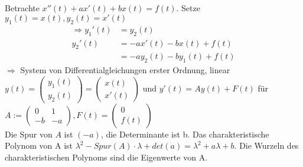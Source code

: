 \documentclass[12pt,a4paper]{article}
\newcommand{\DGLs}{Differentialgleichungen }
\begin{document}
\subsection{}
Betrachte $x''(t) + ax'(t) +bx(t) = f(t)$. Setze $y_1(t) = x(t), y_2(t) = x'(t)$
\begin{align*}
\Rightarrow y_1'(t) &= y_2(t) \\
y_2'(t) &= -ax'(t)-bx(t)+f(t) \\
&= -ay_2(t)-by_1(t)+f(t)
\end{align*}
$\Rightarrow$ System von \DGLs erster Ordnung, linear \\
$y(t) = \begin{pmatrix}
y_1(t) \\
y_2(t)
\end{pmatrix} = \begin{pmatrix}
x(t) \\
x'(t)
\end{pmatrix} $ und $y'(t) = Ay(t) + F(t)$ für $A:= \begin{pmatrix}
0 & 1 \\
-b & -a
\end{pmatrix}, F(t) = \begin{pmatrix}
0 \\
f(t)
\end{pmatrix}$ \\
Die Spur von $A$ ist $(-a)$, die Determinante ist b. Das charakteristische Polynom von A ist $\lambda^2-Spur(A) \cdot \lambda + det(a) = \lambda^2+a\lambda+b$. Die Wurzeln des charakteristischen Polynoms sind die Eigenwerte von A.
\end{document}
